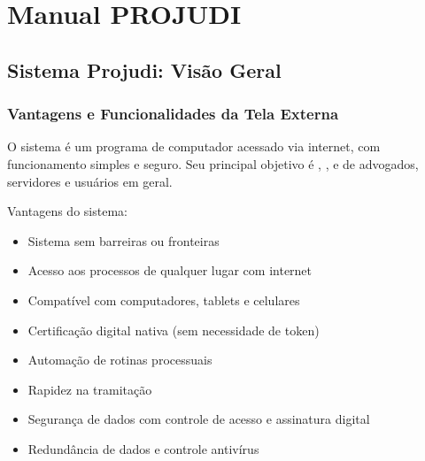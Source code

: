 \documentclass[letterpaper,10pt,brazil]{sphinxmanual}
\begin{document}
\sphinxstepscope


\section{Manual PROJUDI}
\label{\detokenize{manualprojudi:manual-projudi}}\label{\detokenize{manualprojudi::doc}}
\sphinxstepscope


\subsection{Sistema Projudi: Visão Geral}
\label{\detokenize{projud_01_visaogeral:sistema-projudi-visao-geral}}\label{\detokenize{projud_01_visaogeral::doc}}

\subsubsection{Vantagens e Funcionalidades da Tela Externa}
\label{\detokenize{projud_01_visaogeral:vantagens-e-funcionalidades-da-tela-externa}}
\sphinxAtStartPar
O sistema  é um programa de computador acessado via internet, com funcionamento simples e seguro. Seu principal objetivo é , ,  e  de advogados, servidores e usuários em geral.

\sphinxAtStartPar
Vantagens do sistema:
\begin{itemize}
\item {} 
\sphinxAtStartPar
Sistema sem barreiras ou fronteiras

\item {} 
\sphinxAtStartPar
Acesso aos processos de qualquer lugar com internet

\item {} 
\sphinxAtStartPar
Compatível com computadores, tablets e celulares

\item {} 
\sphinxAtStartPar
Certificação digital nativa (sem necessidade de token)

\item {} 
\sphinxAtStartPar
Automação de rotinas processuais

\item {} 
\sphinxAtStartPar
Rapidez na tramitação

\item {} 
\sphinxAtStartPar
Segurança de dados com controle de acesso e assinatura digital

\item {} 
\sphinxAtStartPar
Redundância de dados e controle antivírus

\end{itemize}
\end{document}
